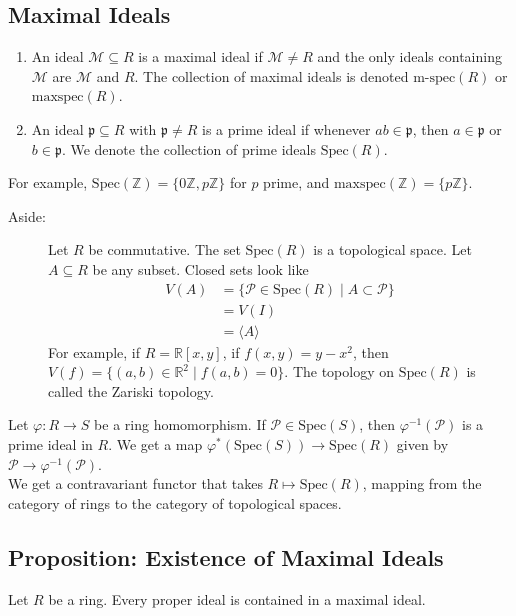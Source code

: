 \documentclass[10pt]{extarticle}
\newcommand{\Z}{\mathbb{Z}}
\newcommand{\R}{\mathbb{R}}
\begin{document}
  \subsection{Maximal Ideals}%
  \begin{enumerate}[(1)]
    \item An ideal $\mathcal{M}\subseteq R$ is a maximal ideal if $\mathcal{M}\neq R$ and the only ideals containing $\mathcal{M}$ are $\mathcal{M}$ and $R$. The collection of maximal ideals is denoted $\text{m-spec}(R)$ or $\text{maxspec}(R)$.
    \item An ideal $\mathfrak{p}\subseteq R$ with $\mathfrak{p} \neq R$ is a prime ideal if whenever $ab \in \mathfrak{p}$, then $a\in \mathfrak{p}$ or $b\in \mathfrak{p}$. We denote the collection of prime ideals $\text{Spec}(R)$.
  \end{enumerate}
  For example, $\text{Spec}(\Z) = \{0\Z,p\Z\}$ for $p$ prime, and $\text{maxspec}(\Z) = \{p\Z\}$.
  \begin{description}
    \item[Aside:] Let $R$ be commutative. The set $\text{Spec}(R)$ is a topological space. Let $A\subseteq R$ be any subset. Closed sets look like
      \begin{align*}
        V(A) &= \{\mathcal{P}\in \text{Spec}(R) \mid A \subset \mathcal{P}\}\\
             &= V(I)\\
             &= \langle A \rangle
      \end{align*}
      For example, if $R = \R[x,y]$, if $f(x,y) = y-x^2$, then $V(f) = \{(a,b)\in \R^2\mid f(a,b) = 0\}$. The topology on $\text{Spec}(R)$ is called the Zariski topology.
  \end{description}
  Let $\varphi: R\rightarrow S$ be a ring homomorphism. If $\mathcal{P}\in \text{Spec}(S)$, then $\varphi^{-1}(\mathcal{P})$ is a prime ideal in $R$. We get a map $\varphi^{\ast}(\text{Spec}(S)) \rightarrow \text{Spec}(R)$ given by $\mathcal{P}\rightarrow \varphi^{-1}(\mathcal{P})$.\\

  We get a contravariant functor that takes $R\mapsto \text{Spec}(R)$, mapping from the category of rings to the category of topological spaces. 
  \subsection{Proposition: Existence of Maximal Ideals}%
  Let $R$ be a ring. Every proper ideal is contained in a maximal ideal.\\
\end{document}
